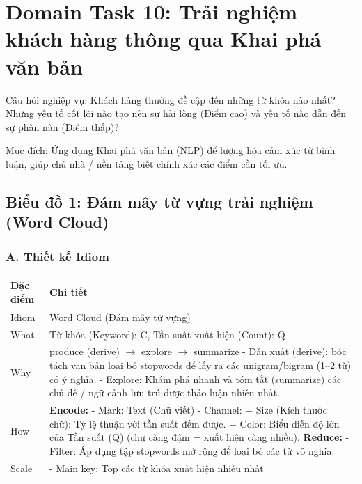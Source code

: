 \section{Domain Task 10: Trải nghiệm khách hàng thông qua Khai phá văn bản}

Câu hỏi nghiệp vụ: Khách hàng thường đề cập đến những từ khóa nào nhất?
Những yếu tố cốt lõi nào tạo nên sự hài lòng (Điểm cao) và yếu tố nào dẫn
đến sự phàn nàn (Điểm thấp)?

Mục đích: Ứng dụng Khai phá văn bản (NLP) để lượng hóa cảm xúc từ bình
luận, giúp chủ nhà / nền tảng biết chính xác các điểm cần tối ưu.

\subsection{Biểu đồ 1: Đám mây từ vựng trải nghiệm (Word Cloud)}

\subsubsection*{A. Thiết kế Idiom}

\begin{longtable}{|p{2.8cm}|p{11.5cm}|}
\hline
\textbf{Đặc điểm} & \textbf{Chi tiết} \\
\hline
\endhead
\hline
\endfoot
Idiom & Word Cloud (Đám mây từ vựng) \\
\hline
What & Từ khóa (Keyword): C, Tần suất xuất hiện (Count): Q \\
\hline
Why & produce (derive) $\rightarrow$ explore $\rightarrow$ summarize \newline
\newline
- Dẫn xuất (derive): bóc tách văn bản loại bỏ stopwords để lấy ra các unigram/bigram (1--2 từ) có ý nghĩa. \newline
\newline
- Explore: Khám phá nhanh và tóm tắt (summarize) các chủ đề / ngữ cảnh lưu trú được thảo luận nhiều nhất. \\
\hline
How & \textbf{Encode:} \newline
\newline
- Mark: Text (Chữ viết) \newline
\newline
- Channel: \newline
\newline
\hspace{0.3cm} + Size (Kích thước chữ): Tỷ lệ thuận với tần suất đếm được. \newline
\newline
\hspace{0.3cm} + Color: Biểu diễn độ lớn của Tần suất (Q) (chữ càng đậm = xuất hiện càng nhiều). \newline
\newline
\textbf{Reduce:} \newline
\newline
- Filter: Áp dụng tập stopwords mở rộng để loại bỏ các từ vô nghĩa. \\
\hline
Scale & - Main key: Top các từ khóa xuất hiện nhiều nhất \\
\hline
\end{longtable}

